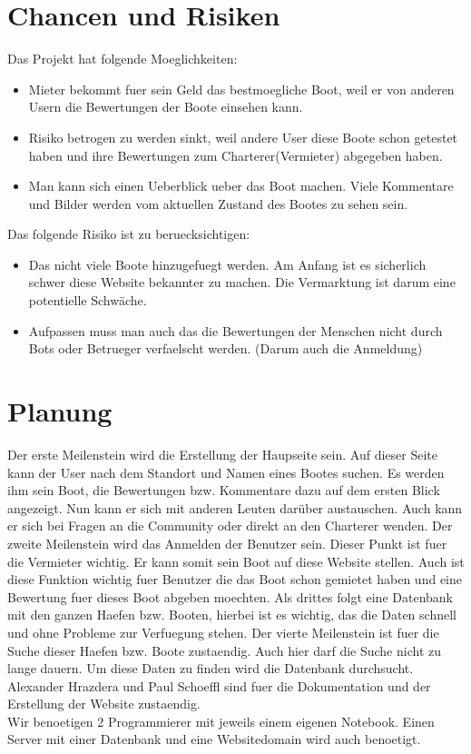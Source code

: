 \documentclass[12pt]{article}
\theoremstyle{definition}
\begin{document}
\pagebreak

\section{Chancen und Risiken}
Das Projekt hat folgende Moeglichkeiten:
\begin{itemize}
\item Mieter bekommt fuer sein Geld das bestmoegliche Boot, weil er von anderen Usern die Bewertungen der Boote einsehen kann.
\item Risiko betrogen zu werden sinkt, weil andere User diese Boote schon getestet haben und ihre Bewertungen zum Charterer(Vermieter) abgegeben haben.
\item Man kann sich einen Ueberblick ueber das Boot machen. Viele Kommentare und Bilder werden vom aktuellen Zustand des Bootes zu sehen sein.
\end{itemize}

Das folgende Risiko ist zu beruecksichtigen:
\begin{itemize}
\item Das nicht viele Boote hinzugefuegt werden. Am Anfang ist es sicherlich schwer diese Website bekannter zu machen. Die Vermarktung ist darum eine potentielle Schwäche.
\item Aufpassen muss man auch das die Bewertungen der Menschen nicht durch Bots oder Betrueger verfaelscht werden. (Darum auch die Anmeldung)
\end{itemize}

\pagebreak

\section{Planung}
Der erste Meilenstein wird die Erstellung der Haupseite sein. Auf dieser Seite kann der User nach dem Standort und Namen eines Bootes suchen. Es werden ihm sein Boot, die Bewertungen bzw. Kommentare dazu auf dem ersten Blick angezeigt. Nun kann er sich mit anderen Leuten darüber austauschen. Auch kann er sich bei Fragen an die Community oder direkt an den Charterer wenden. 
Der zweite Meilenstein wird das Anmelden der Benutzer sein. Dieser Punkt ist fuer die Vermieter wichtig. Er kann somit sein Boot auf diese Website stellen. Auch ist diese Funktion wichtig fuer Benutzer die das Boot schon gemietet haben und eine Bewertung fuer dieses Boot abgeben moechten.
Als drittes folgt eine Datenbank mit den ganzen Haefen bzw. Booten, hierbei ist es wichtig, das die Daten schnell und ohne Probleme zur Verfuegung stehen. Der vierte Meilenstein ist fuer die Suche dieser Haefen bzw. Boote zustaendig. Auch hier darf die Suche nicht zu lange dauern. Um diese Daten zu finden wird die Datenbank durchsucht.\\ Alexander Hrazdera und Paul Schoeffl sind fuer die Dokumentation und der Erstellung der Website zustaendig.\\ Wir benoetigen 2 Programmierer mit jeweils einem eigenen Notebook. Einen Server mit einer Datenbank und eine Websitedomain wird auch benoetigt.
\end{document}
